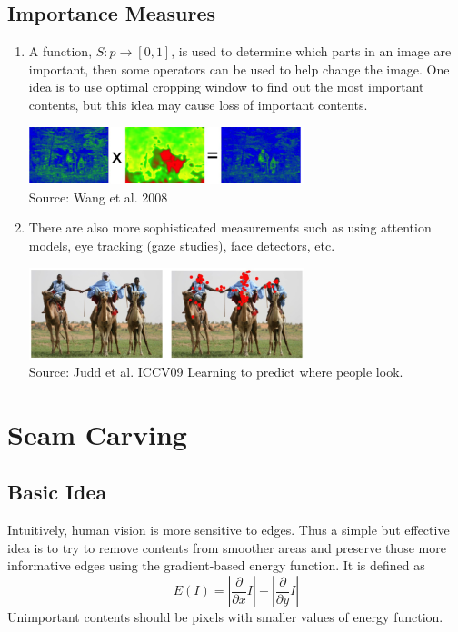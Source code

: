 \documentclass{article}
\begin{document}
\subsection{Importance Measures}
\begin{enumerate}
\item A function, $S: p \rightarrow [0,1]$, is used to determine which parts in an image are important, then some operators can be used to help change the image. One idea is to use optimal cropping window to find out the most important contents, but this idea may cause loss of important contents.
\begin{center}
\includegraphics[width=8cm]{Function.png}\\
Source: Wang et al. 2008
\end{center}

\item There are also more sophisticated measurements such as using attention models, eye tracking (gaze studies), face detectors, etc.
\begin{center}
\includegraphics[width=8cm]{Tracking.png}\\
Source: Judd et al. ICCV09 Learning to predict where people look.
\end{center}

\end{enumerate}

\section{Seam Carving}

\subsection{Basic Idea}
Intuitively, human vision is more sensitive to edges. Thus a simple but effective idea is to try to remove contents from smoother areas and preserve those more informative edges using the gradient-based energy function. It is defined as
$$
E(I) = |\frac{\partial}{\partial x}I| + |\frac{\partial}{\partial y}I|
$$
Unimportant contents should be pixels with smaller values of energy function.
\end{document}

